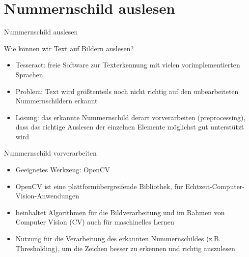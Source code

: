 \section{Nummernschild auslesen}

\begin{frame}{Nummernschild auslesen}

Wie können wir Text auf Bildern auslesen?

\begin{itemize}
\item Tesseract: freie Software zur Texterkennung mit vielen vorimplementierten Sprachen \cite{smith_2007}
\item Problem: Text wird größtenteils noch nicht richtig auf den unbearbeiteten Nummernschildern erkannt
\item Lösung: das erkannte Nummernschild derart vorverarbeiten (preprocessing), dass das richtige Auslesen der einzelnen Elemente möglichst gut unterstützt wird
\end{itemize}

\end{frame}

\begin{frame}{Nummernschild vorverarbeiten}

\begin{itemize}
\item Geeignetes Werkzeug: OpenCV \cite{opencv_tutorial}
\item OpenCV ist eine plattformübergreifende Bibliothek, für Echtzeit-Computer-Vision-Anwendungen
\item beinhaltet Algorithmen für die Bildverarbeitung und im Rahmen von Computer Vision (CV) auch für maschinelles Lernen
\item Nutzung für die Verarbeitung des erkannten Nummernschildes (z.B. Thresholding), um die Zeichen besser zu erkennen und richtig auszulesen
\end{itemize}

\end{frame}

